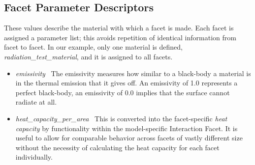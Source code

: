 \subsection{Facet Parameter Descriptors}
These values describe the material with which a facet is made.  Each facet is assigned a parameter list; this avoids repetition of identical information from facet to facet.  In our example, only one material is defined, \textit{radiation\_test\_material}, and it is assigned to all facets.
\begin{itemize}
\item{\textit{emissivity}}\ \newline
The emissivity measures how similar to a black-body a material is in the thermal emission that it gives off.  An emissivity of 1.0 represents a perfect black-body, an emissivity of 0.0 implies that the surface cannot radiate at all.
\item{\textit{heat\_capacity\_per\_area}}\ \newline
This is converted into the facet-specific \textit{heat capacity} by functionality within the model-specific Interaction Facet.  It is useful to allow for comparable behavior across facets of vastly different size without the necessity of calculating the heat capacity for each facet individually.
\end{itemize}
